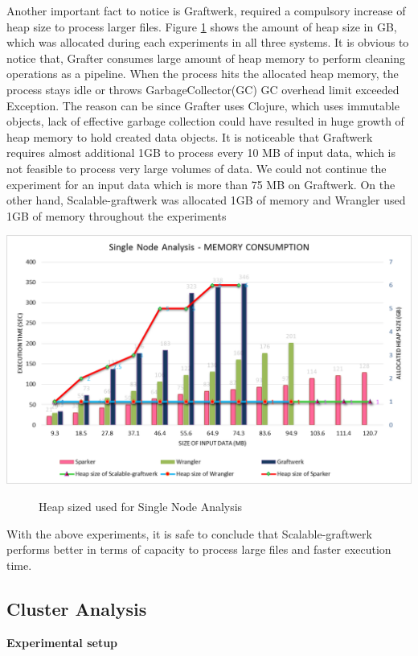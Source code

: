 Another important fact to notice is Graftwerk, required a compulsory increase of heap size to process larger files. Figure \ref{fig:heapsize} shows the amount of heap size in GB, which was allocated during each experiments in all three systems. It is obvious to notice that, Grafter consumes large amount of heap memory to perform cleaning operations as a pipeline. When the process hits the allocated heap memory, the process stays idle or throws GarbageCollector(GC) GC overhead limit exceeded Exception. The reason can be since Grafter uses Clojure, which uses immutable objects, lack of effective garbage collection could have resulted in huge growth of heap memory to hold created data objects. It is noticeable that Graftwerk requires almost additional 1GB to process every 10 MB of input data, which is not feasible to process very large volumes of data. We could not continue the experiment for an input data which is more than 75 MB on Graftwerk. On the other hand, Scalable-graftwerk was allocated 1GB of memory and Wrangler used 1GB of memory throughout the experiments
\begin{center}
	\includegraphics[width=38em]{./Figures/heapsize2}
	\begin{figure}[htbp]
    \caption{Heap sized used for Single Node Analysis}
    \label{fig:heapsize}
	\end{figure}
\end{center}
With the above experiments, it is safe to conclude that Scalable-graftwerk performs better in terms of capacity to process large files and faster execution time. 
\subsection{Cluster Analysis}
\textbf{Experimental setup}

